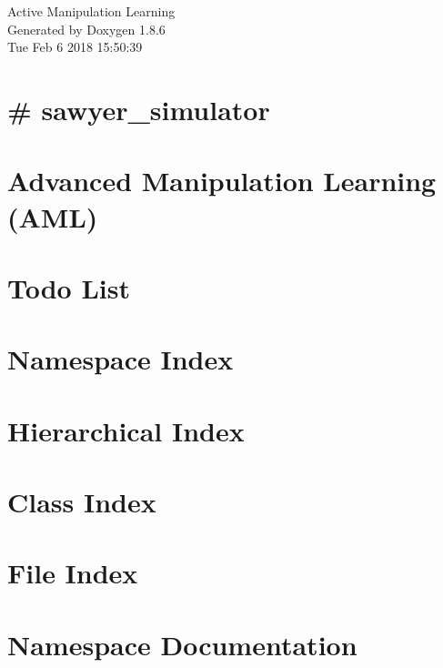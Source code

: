\documentclass[twoside]{book}
\newcommand{\clearemptydoublepage}{%
  \newpage{\pagestyle{empty}\cleardoublepage}%
}
\begin{document}
\hypersetup{pageanchor=false}
\begin{titlepage}
\vspace*{7cm}
\begin{center}%
{\Large Active Manipulation Learning }\\
\vspace*{1cm}
{\large Generated by Doxygen 1.8.6}\\
\vspace*{0.5cm}
{\small Tue Feb 6 2018 15:50:39}\\
\end{center}
\end{titlepage}
\clearemptydoublepage
\tableofcontents
\clearemptydoublepage
{}
\hypersetup{pageanchor=true}

\chapter{\# sawyer\-\_\-simulator}
\label{md_aml_sawyer_sim__r_e_a_d_m_e}
\hypertarget{md_aml_sawyer_sim__r_e_a_d_m_e}{}

\chapter{Advanced Manipulation Learning (A\-M\-L)}
\label{md__r_e_a_d_m_e}
\hypertarget{md__r_e_a_d_m_e}{}

\chapter{Todo List}
\label{todo}
\hypertarget{todo}{}

\chapter{Namespace Index}

\chapter{Hierarchical Index}

\chapter{Class Index}

\chapter{File Index}

\chapter{Namespace Documentation}




\end{document}
